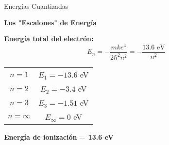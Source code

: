 \documentclass[12pt,aspectratio=169]{beamer}
\begin{document}
\begin{frame}{Energías Cuantizadas}
    \begin{center}
        \huge \textbf{Los "Escalones" de Energía}
    \end{center}
    
    \vspace{1cm}
    \begin{center}
        \colorbox{azuloscuro!10}{\parbox{0.9\textwidth}{
            \begin{center}
                \Large \textbf{Energía total del electrón:}
                \vspace{0.5cm}
                \Huge $$E_n = -\frac{mke^4}{2\hbar^2n^2} = -\frac{13.6 \text{ eV}}{n^2}$$
            \end{center}
        }}
    \end{center}
    
    \vspace{1cm}
    \begin{center}
        \begin{tabular}{cc}
            \Large $n = 1$ & \Large $E_1 = -13.6$ eV \\[0.3cm]
            \Large $n = 2$ & \Large $E_2 = -3.4$ eV \\[0.3cm]
            \Large $n = 3$ & \Large $E_3 = -1.51$ eV \\[0.3cm]
            \Large $n = \infty$ & \Large $E_\infty = 0$ eV
        \end{tabular}
    \end{center}
    
    \vspace{0.5cm}
    \begin{center}
        \LARGE \textcolor{rojoclaro}{\textbf{Energía de ionización = 13.6 eV}}
    \end{center}
\end{frame}
\end{document}
